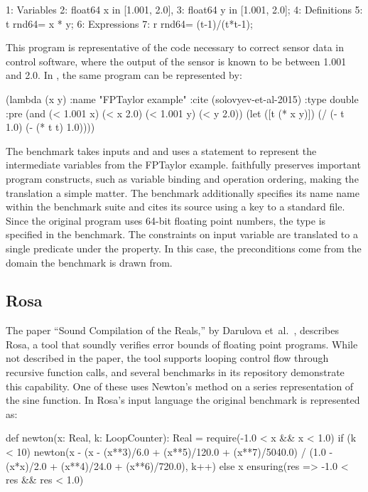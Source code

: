 \documentclass[main.tex]{subfiles}
\begin{document}
\begin{code}
1: Variables
2:   float64 x in [1.001, 2.0],
3:   float64 y in [1.001, 2.0];
4: Definitions
5:   t rnd64= x * y;
6: Expressions
7:   r rnd64= (t-1)/(t*t-1);
\end{code}

This program is representative of the code necessary to correct sensor data
in control software, where the output of the sensor is known to be between
1.001 and 2.0. In \core, the same program can be represented by:

\begin{code}
(lambda (x y)
  :name "FPTaylor example"
  :cite (solovyev-et-al-2015)
  :type double
  :pre (and (< 1.001 x) (< x 2.0) (< 1.001 y) (< y 2.0))
  (let ([t (* x y)])
    (/ (- t 1.0)  (- (* t t) 1.0))))
\end{code}

The benchmark takes inputs  and 
  and uses a  statement to represent the intermediate variables
  from the FPTaylor example.
\core faithfully preserves important program constructs,
  such as variable binding and operation ordering,
  making the translation a simple matter.
The benchmark additionally specifies
  its name name within the benchmark suite
  and cites its source using a key to a standard \BibTeX{} file.
Since the original program uses 64-bit floating point numbers,
  the type  is specified in the benchmark.
The constraints on input variable are translated to
  a single predicate under the  property.
In this case, the preconditions come from
  the domain the benchmark is drawn from.

\subsection{Rosa}
The paper ``Sound Compilation of the Reals,''
by Darulova et~al.~\cite{DarulovaK14},
describes Rosa, a tool that soundly verifies
error bounds of floating point programs. While not described in the
paper, the tool supports looping control flow through recursive
function calls, and several benchmarks in its repository 
demonstrate this capability. One of these uses Newton's method
on a series representation of the sine function. In Rosa's input
language the original benchmark is represented as:

\begin{code}
def newton(x: Real, k: LoopCounter): Real = {
  require(-1.0 < x && x < 1.0)
  if (k < 10) {
    newton(x - (x - (x**3)/6.0 + (x**5)/120.0 + (x**7)/5040.0) / 
      (1.0 - (x*x)/2.0 + (x**4)/24.0 + (x**6)/720.0), k++)
  } else {
    x
  }
} ensuring(res => -1.0 < res && res < 1.0)
\end{code}
\end{document}
